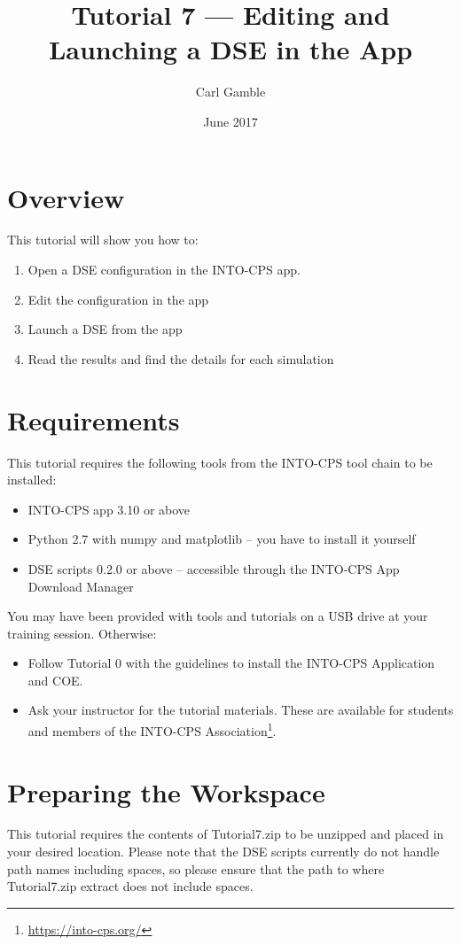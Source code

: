 \documentclass[11pt,a4paper]{../tutorial}
\title{Tutorial 7 --- Editing and Launching a DSE in the App}
\date{June 2017}
\author{Carl Gamble}
\begin{document}
\section*{Overview}

This tutorial will show you how to:

\begin{enumerate}[noitemsep]
\item Open a DSE configuration in the INTO-CPS app.
\item Edit the configuration in the app
\item Launch a DSE from the app
\item Read the results and find the details for each simulation
\end{enumerate}

\section*{Requirements}

This tutorial requires the following tools from the INTO-CPS tool chain to be installed:

\begin{itemize}[noitemsep]
\item INTO-CPS app 3.10 or above
\item Python 2.7 with numpy and matplotlib -- you have to install it yourself
\item DSE scripts 0.2.0 or above -- accessible through the INTO-CPS App Download Manager
\end{itemize}

You may have been provided with tools and tutorials on a USB drive at your training session. Otherwise: 
\begin{itemize}[noitemsep]
\item Follow Tutorial 0 with the guidelines to install the INTO-CPS Application and COE.
\item Ask your instructor for the tutorial materials. These are available for students and members of the INTO-CPS Association\footnote{\url{https://into-cps.org/}}.
\end{itemize}


\section{Preparing the Workspace}
This tutorial requires the contents of Tutorial7.zip to be unzipped and placed in your desired location.  Please note that the DSE scripts currently do not handle path names including spaces, so please ensure that the path to where Tutorial7.zip extract does not include spaces.
\end{document}
